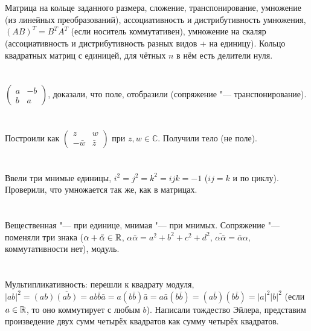 \section{} %
Матрица на кольце заданного размера, сложение, транспонирование, умножение (из линейных преобразований),
ассоциативность и дистрибутивность умножения, $(AB)^{T}=B^{T}A^{T}$ (если носитель коммутативен),
умножение на скаляр (ассоциативность и дистрибутивность разных видов + на единицу). Кольцо квадратных
матриц с единицей, для чётных $n$ в нём есть делители нуля.

\section{} %
$\left(\begin{matrix}a & -b \\ b & a\end{matrix}\right)$, доказали, что поле, отобразили (сопряжение "--- транспонирование).

\section{} %
Построили как $\left(\begin{matrix}z & w \\ -\bar w & \bar z\end{matrix}\right)$ при $z, w \in \mathbb{C}$. Получили тело (не поле).

\section{} %
Ввели три мнимые единицы, $i^2=j^2=k^2=ijk=-1$ ($ij=k$ и по циклу). Проверили, что умножается так же, как в матрицах.

\section{} %
Вещественная "--- при единице, мнимая "--- при мнимых. Сопряжение "--- поменяли три знака ($\alpha+\bar\alpha \in \mathbb{R}$, $\alpha\bar \alpha=a^2+b^2+c^2+d^2$,
$\overline{\alpha \bar \alpha} = \bar \alpha \alpha$, коммутативности нет),
модуль.

\section{} %
Мультипликативность: перешли к квадрату модуля, $|ab|^2 = (ab)\overline{(ab)} = ab\bar b \bar a = a(b \bar b)\bar a = a\bar a(b \bar b) = (a \bar b)(b \bar b) = |a|^2|b|^2$
(если $a\in \mathbb{R}$, то оно коммутирует с любым $b$). Написали тождество Эйлера, представим произведение двух сумм четырёх квадратов как сумму четырёх
квадратов.

